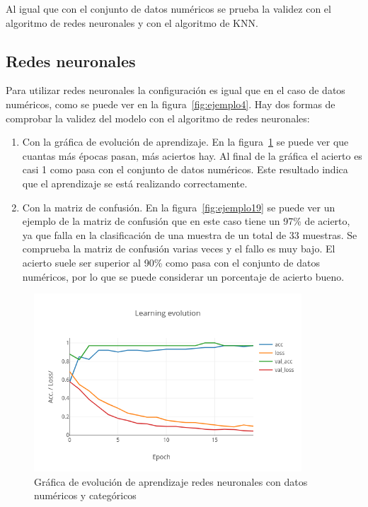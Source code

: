 \documentclass[a4paper, 12pt]{book}
\begin{document}
Al igual que con el conjunto de datos numéricos se prueba la validez con el algoritmo de redes neuronales y con el algoritmo de KNN.

\subsection{Redes neuronales}
\label{subsec:redesneuronales2}

Para utilizar redes neuronales la configuración es igual que en el caso de datos numéricos, como se puede ver en la figura~\ref{fig:ejemplo4}.
Hay dos formas de comprobar la validez del modelo con el algoritmo de redes neuronales:

\begin{enumerate}
\item Con la gráfica de evolución de aprendizaje. En la figura~\ref{fig:ejemplo18} se puede ver que cuantas más épocas pasan, más aciertos hay. Al final de la gráfica el acierto es casi 1 como pasa con el conjunto de datos numéricos.
Este resultado indica que el aprendizaje se está realizando correctamente.
 \item Con la matriz de confusión. En la figura~\ref{fig:ejemplo19} se puede ver un ejemplo de la matriz de confusión que en este caso tiene un 97\% de acierto, ya que falla en la clasificación de una muestra de un total de 33 muestras. Se comprueba la matriz de confusión varias veces y el fallo es muy bajo. El acierto suele ser superior al 90\% como pasa con el conjunto de datos numéricos, por lo que se puede considerar un porcentaje de acierto bueno.
 \end{enumerate}
 
 \begin{figure}
	\centering
	\includegraphics[width=10cm, keepaspectratio]{img/le_numycat_rn.png}
	\caption{Gráfica de evolución de aprendizaje redes neuronales con datos numéricos y categóricos} 	\label{fig:ejemplo18}
\end{figure}
\end{document}
